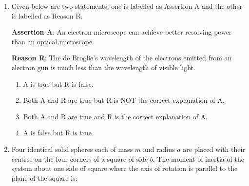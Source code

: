 \documentclass[journal]{IEEEtran}
\begin{document}
\begin{enumerate}
    \begin{multicols}{4}
    \begin{enumerate}
        \item $0.75 mm$
        \item $0.50 mm$
        \item $1 mm$
        \item $0.25 mm$
    \end{enumerate}
    \end{multicols}

    \item Given below are two statements: one is labelled as Assertion A and the
    other is labelled as Reason R.

    \textbf{Assertion A}: An electron microscope can achieve better resolving power
    than an optical microscope.

    \textbf{Reason R}: The de Broglie's wavelength of the electrons emitted from an
    electron gun is much less than the wavelength of visible light.

    \begin{enumerate}
        \item A is true but R is false.
        \item Both A and R are true but R is NOT the correct explanation of A.
        \item Both A and R are true and R is the correct explanation of A.
        \item A is false but R is true.
    \end{enumerate} 

    \item Four identical solid spheres each of mass $m$ and radius $a$ are placed
    with their centres on the four corners of a square of side $b$. The moment of
    inertia of the system about one side of square where the axis of rotation is
    parallel to the plane of the square is:

    \begin{center}
    \end{center}
    

\end{enumerate}
\end{document}
